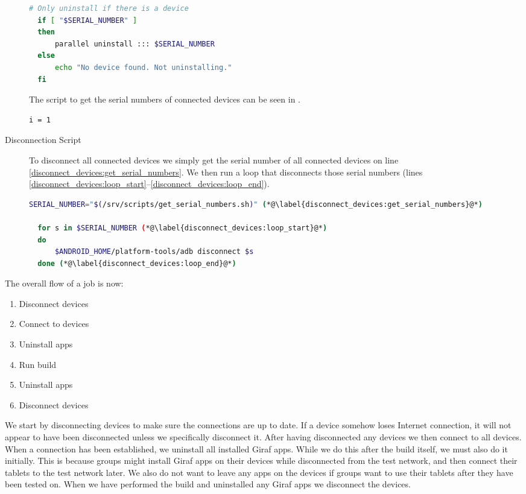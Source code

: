 \begin{description}
\begin{lstlisting}[language=bash,caption=Script that uninstalls all installed Giraf apps on all devices,label=lst:uninstall_apks]
  # Only uninstall if there is a device
  if [ "$SERIAL_NUMBER" ]
  then
      parallel uninstall ::: $SERIAL_NUMBER
  else
      echo "No device found. Not uninstalling."
  fi
  \end{lstlisting}

  The script to get the serial numbers of connected devices can be seen in .

  \begin{lstlisting}[language=bash,caption=Script that gets the serial numbers of all connected devices,label=lst:get_serial_numbers]
  i = 1
  \end{lstlisting}
  \item[Disconnection Script] To disconnect all connected devices we simply get the serial number of all connected devices on line \ref{disconnect_devices:get_serial_numbers}. We then run a loop that disconnects those serial numbers (lines \ref{disconnect_devices:loop_start}--\ref{disconnect_devices:loop_end}).
  \begin{lstlisting}[language=bash,caption=Script that disconnects all connected devices,label=lst:disconnect_devices]
  SERIAL_NUMBER="$(/srv/scripts/get_serial_numbers.sh)" (*@\label{disconnect_devices:get_serial_numbers}@*)

  for s in $SERIAL_NUMBER (*@\label{disconnect_devices:loop_start}@*)
  do
      $ANDROID_HOME/platform-tools/adb disconnect $s
  done (*@\label{disconnect_devices:loop_end}@*)
  \end{lstlisting}
\end{description}

The overall flow of a job is now:

\begin{enumerate}
  \item Disconnect devices
  \item Connect to devices
  \item Uninstall apps
  \item Run build
  \item Uninstall apps
  \item Disconnect devices
\end{enumerate}

We start by disconnecting devices to make sure the connections are up to date. If a device somehow loses Internet connection, it will not appear to have been disconnected unless we specifically disconnect it. After having disconnected any devices we then connect to all devices. When a connection has been established, we uninstall all installed Giraf apps. While we do this after the build itself, we must also do it initially. This is because groups might install Giraf apps on their devices while disconnected from the test network, and then connect their tablets to the test network later. We also do not want to leave any apps on the devices if groups want to use their tablets after they have been tested on. When we have performed the build and uninstalled any Giraf apps we disconnect the devices.

